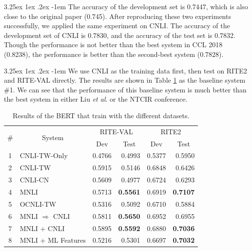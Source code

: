\documentclass[12pt]{article}
\makeatletter
\renewcommand\paragraph{\@startsection{paragraph}{5}{\z@}%
  {3.25ex \@plus1ex \@minus.2ex}%
  {-1em}%
  {\normalfont\normalsize\bfseries}}
\makeatother
\begin{document}
\begin{CJK*}{UTF8}{bkai}
\begin{spacing}{1.77}
\paragraph{}
The accuracy of the development set is 0.7447, which is also close to the original paper (0.745). After reproducing these two experiments successfully, we applied the same experiment on CNLI. The accuracy of the development set of CNLI is 0.7830, and the accuracy of the test set is 0.7832. Though the performance is not better than the best system in CCL 2018 (0.8238), the performance is better than the second-best system (0.7828).

\paragraph{}
We use CNLI as the training data first, then test on RITE2 and RITE-VAL directly. The results are shown in Table \ref{result:bert_compare} as the baseline system \#1. We can see that the performance of this baseline system is much better than the best system in either Liu \emph{et al}. or the NTCIR conference.

\begin{table}[H]
  \centering
  \setlength{\extrarowheight}{-3pt}
  \begin{tabular}{|c|l|r|r|r|r|}
  \hline
  \multirow{2}{*}{\#} & \multicolumn{1}{c|}{\multirow{2}{*}{System}} & \multicolumn{2}{c|}{RITE-VAL} & \multicolumn{2}{c|}{RITE2} \\ \cline{3-6}
   & \multicolumn{1}{c|}{} & \multicolumn{1}{c|}{Dev} & \multicolumn{1}{c|}{Test} & \multicolumn{1}{c|}{Dev} & \multicolumn{1}{c|}{Test} \\ \hline
  1 & CNLI-TW-Only & 0.4766 & 0.4993 & 0.5377 & 0.5950 \\ \hline
  2 & CNLI-TW & 0.5915 & 0.5146 & 0.6848 & 0.6426 \\ \hline
  3 & CNLI-CN & 0.5609 & 0.4977 & 0.6724 & 0.6293 \\ \hline
  4 & MNLI & 0.5713 & \textbf{0.5561} & 0.6919 & \textbf{0.7107} \\ \hline
  5 & OCNLI-TW & 0.5316 & 0.5092 & 0.6710 & 0.5884 \\ \hline
  6 & MNLI $\Rightarrow$ CNLI & 0.5811 & \textbf{0.5650} & 0.6952 & 0.6955 \\ \hline
  7 & MNLI + CNLI & 0.5895 & \textbf{0.5592} & 0.6880 & \textbf{0.7036} \\ \hline
  8 & MNLI + ML Features & 0.5216 & 0.5301 & 0.6697 & \textbf{0.7032} \\ \hline
  \end{tabular}
  \caption{Results of the BERT that train with the different datasets.}
  \label{result:bert_compare}
\end{table}


\end{spacing}
\end{CJK*}
\end{document}
